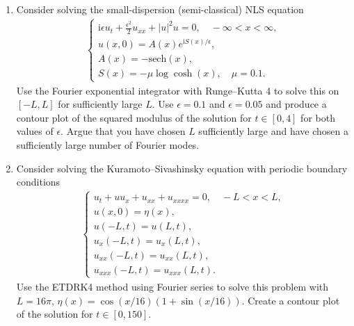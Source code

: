 \documentclass[10pt]{amsart}
\newcommand{\I}{\text{i}}
\begin{document}
\begin{enumerate}[label={\bf Problem~{\arabic*}:}]
    \item Consider solving the small-dispersion (semi-classical) NLS equation
  \begin{align*}
    \begin{cases}
      \I \epsilon u_t + \frac{\epsilon^2}{2} u_{xx} + |u|^2 u = 0, \quad -\infty < x < \infty,\\
      u(x,0) = A(x) e^{\I S(x)/\epsilon},\\
      A(x) = - \mathrm{sech}(x),\\
      S(x) = - \mu \log \cosh (x), \quad \mu = 0.1.
    \end{cases}
    \end{align*}
    Use the Fourier exponential integrator with Runge--Kutta 4 to solve this on $[-L, L]$ for sufficiently large $L$.  Use $\epsilon = 0.1$ and $\epsilon = 0.05$ and produce a contour plot of the squared modulus of the solution for $t \in [0,4]$ for both values of $\epsilon$.  Argue that you have chosen $L$ sufficiently large and have chosen a sufficiently large number of Fourier modes.

    \mline

    \item Consider solving the Kuramoto--Sivashinsky equation with periodic boundary conditions
 \begin{align*}
    \begin{cases} u_t + u u_x + u_{xx} + u_{xxxx} = 0, \quad -L < x <L,\\
      u(x,0) = \eta(x),\\
      u(-L,t) = u(L,t),\\
      u_x(-L,t) = u_x(L,t),\\
      u_{xx}(-L,t) = u_{xx}(L,t),\\
      u_{xxx}(-L,t) = u_{xxx}(L,t).
    \end{cases}
 \end{align*}
 Use the ETDRK4 method using Fourier series to solve this problem with $L = 16 \pi$, $\eta(x) = \cos(x/16) (1 + \sin(x/16))$.  Create a contour plot of the solution for $t \in [0,150]$.
        
  
\end{enumerate}



  
\end{document}
